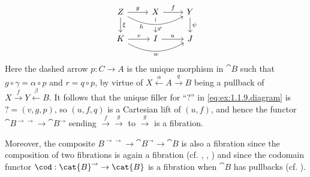 \begin{solution}
\begin{equation*}
\begin{tikzcd}
Z \arrow[r, "g"] \arrow[d, "\xi"] & X \arrow[r, "f"] \arrow[d, near end, "\varphi"] & Y \arrow[d, "\psi"] \\
K \arrow[r, "v"] \arrow[rr, bend right, "w"{below}] & I \arrow[r, "u"] & J
\arrow[from=ull, to=u, bend right, crossing over, near start, "h"{below}]
\end{tikzcd}
\end{equation*}
Here the dashed arrow \(p : C \to A\) is the unique morphism in \(\cat{B}\) such that \(g \circ \gamma = \alpha \circ p\) and \(r = q \circ p\), by virtue of \(X \overset{\alpha}{\leftarrow} A \overset{q}{\rightarrow} B\) being a pullback of \(X \overset{f}{\to} Y \overset{\beta}{\leftarrow} B\).
It follows that the unique filler for ``\(?\)'' in \eqref{eq:ex:1.1.9.diagram} is \(? = (v, g, p)\), so \((u, f, q)\) is a Cartesian lift of \((u, f)\), and hence the functor \(\cat{B}^{\rightarrow\rightarrow} \to \cat{B}^\rightarrow\) sending \(\overset{f}{\to}\overset{g}{\to}\) to \(\overset{g}{\to}\) is a fibration.

Moreover, the composite \(B^{\rightarrow\rightarrow} \to \cat{B}^{\rightarrow} \to \cat{B}\) is also a fibration since the composition of two fibrations is again a fibration (cf. \cite[Proposition~8.1.12]{MR1313497}, \cite[Proposition~3.7]{MR2222646}, \cite[Proposition~3.1]{MR0213413} \cite[Proposition~9.1.10]{MR4261588}) and since the codomain functor \(\cod : \cat{B}^{\rightarrow} \to \cat{B}\) is a fibration when \(\cat{B}\) has pullbacks (cf. \cite[Proposition~1.1.6]{MR1674451}).
\end{solution}